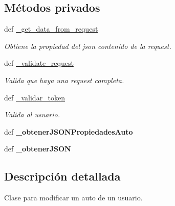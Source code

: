 \subsection*{Métodos privados}
\begin{DoxyCompactItemize}
\item 
def \hyperlink{classsrc_1_1resources_1_1modificar_auto_usuario_1_1_modificar_auto_usuario_a841232f86697888e9a4b529da2091673}{\-\_\-get\-\_\-data\-\_\-from\-\_\-request}
\begin{DoxyCompactList}\small\item\em Obtiene la propiedad del json contenido de la request. \end{DoxyCompactList}\item 
def \hyperlink{classsrc_1_1resources_1_1modificar_auto_usuario_1_1_modificar_auto_usuario_a50d718aa494a3c60a6c50541229a91c1}{\-\_\-validate\-\_\-request}
\begin{DoxyCompactList}\small\item\em Valida que haya una request completa. \end{DoxyCompactList}\item 
def \hyperlink{classsrc_1_1resources_1_1modificar_auto_usuario_1_1_modificar_auto_usuario_a4542c80a3b2eb14aff8eeeb88bb2d16d}{\-\_\-validar\-\_\-token}
\begin{DoxyCompactList}\small\item\em Valida al usuario. \end{DoxyCompactList}\item 
\hypertarget{classsrc_1_1resources_1_1modificar_auto_usuario_1_1_modificar_auto_usuario_a6a30c8d70789c069be09af71bbb75fe4}{def {\bfseries \-\_\-obtener\-J\-S\-O\-N\-Propiedades\-Auto}}\label{classsrc_1_1resources_1_1modificar_auto_usuario_1_1_modificar_auto_usuario_a6a30c8d70789c069be09af71bbb75fe4}

\item 
\hypertarget{classsrc_1_1resources_1_1modificar_auto_usuario_1_1_modificar_auto_usuario_a6e67b5caca1524c720f80ce3b176fba3}{def {\bfseries \-\_\-obtener\-J\-S\-O\-N}}\label{classsrc_1_1resources_1_1modificar_auto_usuario_1_1_modificar_auto_usuario_a6e67b5caca1524c720f80ce3b176fba3}

\end{DoxyCompactItemize}


\subsection{Descripción detallada}
Clase para modificar un auto de un usuario. 



